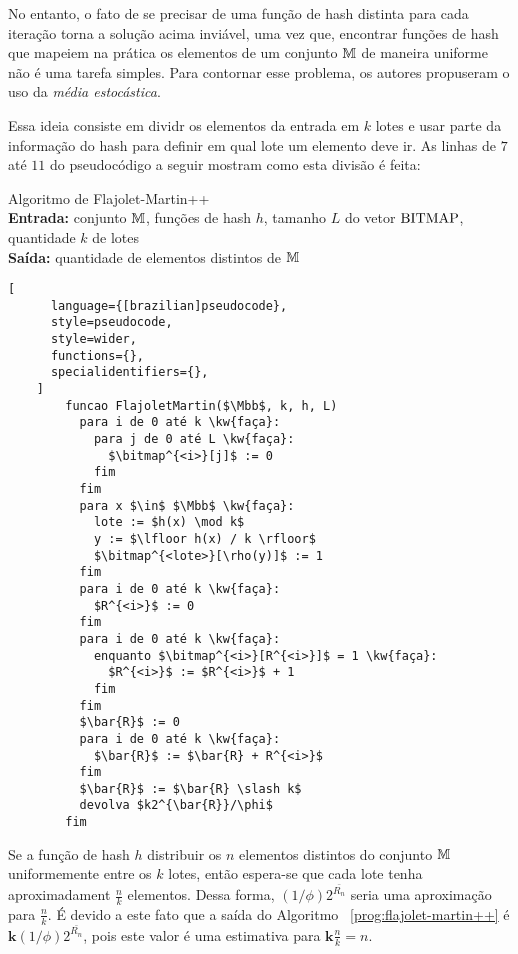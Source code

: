 No entanto, o fato de se precisar de uma função de hash distinta para cada iteração torna a solução acima inviável, 
uma vez que, encontrar funções de hash que mapeiem na prática os elementos de um conjunto $\mathbb{M}$ de maneira
uniforme não é uma tarefa simples. Para contornar esse problema, os autores propuseram o uso da 
\textit{média estocástica}.

Essa ideia consiste em dividr os elementos da entrada em $k$ lotes e usar parte da informação do hash para definir em 
qual lote um elemento deve ir. 
As linhas de $7$ até $11$ do pseudocódigo a seguir mostram como esta divisão é feita:
\begin{programruledcaption}{
  Algoritmo de Flajolet-Martin++
  \\ \textbf{Entrada:} conjunto $\mathbb{M}$, funções de hash $h$, tamanho $L$ do vetor $\text{BITMAP}$, 
  quantidade $k$ de lotes
  \\ \textbf{Saída:} quantidade de elementos distintos de $\mathbb{M}$
  \label{prog:flajolet-martin++}
  }
    \begin{lstlisting}[
      language={[brazilian]pseudocode},
      style=pseudocode,
      style=wider,
      functions={},
      specialidentifiers={},
    ]
        funcao FlajoletMartin($\Mbb$, k, h, L)
          para i de 0 até k \kw{faça}:
            para j de 0 até L \kw{faça}:
              $\bitmap^{<i>}[j]$ := 0
            fim
          fim
          para x $\in$ $\Mbb$ \kw{faça}:
            lote := $h(x) \mod k$
            y := $\lfloor h(x) / k \rfloor$
            $\bitmap^{<lote>}[\rho(y)]$ := 1
          fim
          para i de 0 até k \kw{faça}:
            $R^{<i>}$ := 0
          fim
          para i de 0 até k \kw{faça}:
            enquanto $\bitmap^{<i>}[R^{<i>}]$ = 1 \kw{faça}:
              $R^{<i>}$ := $R^{<i>}$ + 1
            fim
          fim
          $\bar{R}$ := 0
          para i de 0 até k \kw{faça}:
            $\bar{R}$ := $\bar{R} + R^{<i>}$ 
          fim
          $\bar{R}$ := $\bar{R} \slash k$
          devolva $k2^{\bar{R}}/\phi$
        fim
    \end{lstlisting}
  \end{programruledcaption}

Se a função de hash $h$ distribuir os $n$ elementos distintos do conjunto $\mathbb{M}$ uniformemente entre os 
$k$ lotes, então espera-se que cada lote tenha aproximadament $\frac{n}{k}$ elementos. Dessa forma, 
$(1 / \phi)2^{\bar{R_n}}$ seria uma aproximação para $\frac{n}{k}$. É devido a este fato que a saída do Algoritmo~
\ref{prog:flajolet-martin++} é $\mathbf{k} (1 / \phi)2^{\bar{R_n}}$, pois este valor é uma estimativa para 
$\mathbf{k} \frac{n}{k} = n$.

